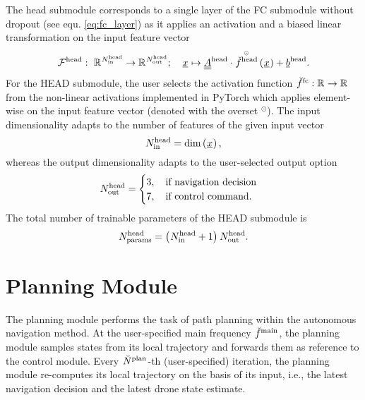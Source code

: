 The head submodule
corresponds to a single layer of the FC submodule
without dropout (see equ. \ref{eq:fc_layer})
as it
applies an activation and a biased linear transformation on the
input feature vector
\begin{align} \label{eq:head}
    \headMap
    :\ 
    \R{\headIn}
    \rightarrow 
    \R{\headOut}
    ;\quad 
    \featvec[]{}{}{}{}
    \mapsto
    \headMat \cdot \hadfct{\headAct}\left(\featvec[]{}{}{}{}\right)
    + \headBias
    .
\end{align}
For the HEAD submodule, the user selects
the activation function $\fcAct : \R{} \rightarrow \R{}$
from the non-linear activations implemented in PyTorch
which applies element-wise on the input feature vector (denoted with the overset ${}^\odot$).
The input dimensionality adapts to the
number of features of the given input vector
\begin{equation}
    \headIn
    =
    \dim \left(\featvec[]{}{}{}{}\right),
\end{equation}
whereas the output dimensionality
adapts to the user-selected output option
\begin{equation}
    \headOut
    = 
    \begin{cases}
        3
        ,\quad 
        \text{if navigation decision} 
        \\
        7
        ,\quad 
        \text{if control command.} 
    \end{cases}
\end{equation}
The total number of trainable parameters of the HEAD submodule is
\begin{equation} \label{eq:head_param}
    \headParam = \left( \headIn + 1 \right) \headOut
    .
\end{equation}






%











\section{Planning Module}
The planning module performs the task of path planning
within the autonomous navigation method.
At the user-specified main frequency 
$\freq[\user]{\main}{}{}{}$,
the planning module 
samples states from its local trajectory
and forwards them as reference to the control module.
Every $\num[\user]{\text{plan}}{}{}{}$-th (user-specified) iteration,
the planning module re-computes its local trajectory
on the basis of its input,
i.e., the latest navigation decision and the latest drone state estimate. 


